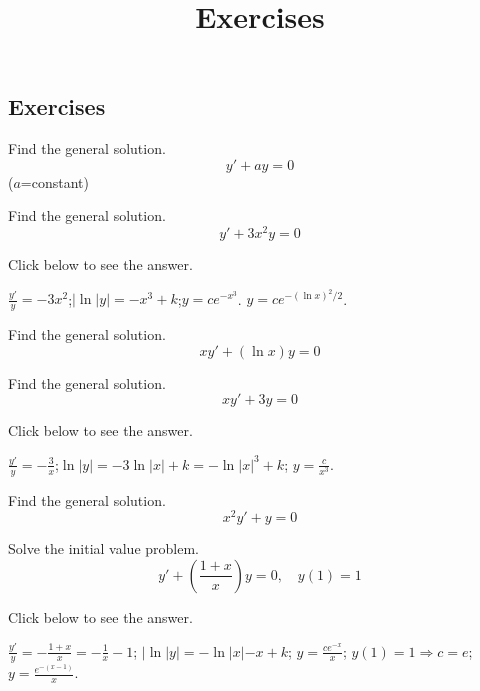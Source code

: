 \documentclass{ximera}
\title{Exercises} \license{CC BY-NC-SA 4.0}
\begin{document}
\begin{abstract}
\end{abstract}
\maketitle

\begin{onlineOnly}
\section*{Exercises}
\end{onlineOnly}

\begin{problem}\label{exer:2.1.1} Find the general solution.
$$y'+ay=0$$
($a$=constant)
\end{problem}

\begin{problem}\label{exer:2.1.2} Find the general solution.
   $$y'+3x^2y=0$$ 

Click below to see the answer.

\begin{expandable}
    $\frac{y'}{y}=-3x^2$;\quad $|\ln|y|=-x^3+k$;\quad $y=ce^{-x^3}$.
$y=ce^{-(\ln x)^2/2}$.
\end{expandable}
\end{problem}

\begin{problem}\label{exer:2.1.3} Find the general solution.
$$xy'+(\ln x)y=0$$
\end{problem}

\begin{problem}\label{exer:2.1.4} Find the general solution.
$$xy'+3y=0$$

Click below to see the answer.

\begin{expandable}
    $\frac{y'}{y}=-\frac{3}{x}$;\quad $\ln|y|=-3\ln|x|+k=-\ln|x|^3+k$;\quad
$y=\frac{c}{x^3}$.
\end{expandable}
\end{problem}

\begin{problem}\label{exer:2.1.5} Find the general solution.
$$x^2y'+y=0$$ 
\end{problem}

 \begin{problem}\label{exer:2.1.6} Solve
the initial value problem.
$$y'+\left(\frac{1+x}{x}\right)y=0,\quad y(1)=1$$

Click below to see the answer.

\begin{expandable}
    $\frac{y'}{y}=-\frac{1+x}{x}=-\frac{1}{x}-1$;\quad
$|\ln|y|=-\ln|x|-x+k$;\quad
$y=\frac{ce^{-x}}{x}$;\quad
$y(1)=1\Rightarrow
 c=e$;\quad
$y=\frac{e^{-(x-1)}}{x}$.
\end{expandable}
\end{problem}
\end{document}

